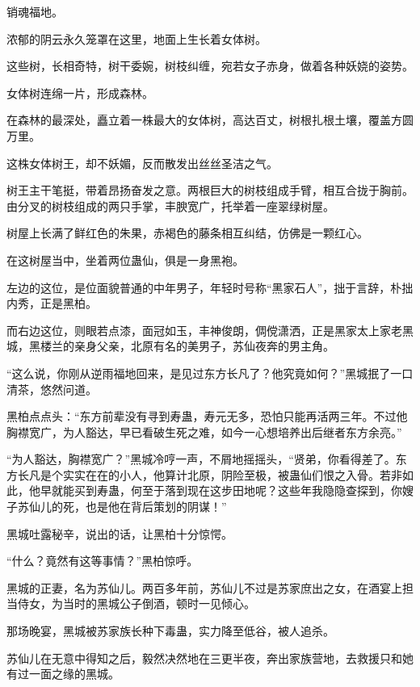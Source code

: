 
\begin{this_body}

销魂福地。

浓郁的阴云永久笼罩在这里，地面上生长着女体树。

这些树，长相奇特，树干委婉，树枝纠缠，宛若女子赤身，做着各种妖娆的姿势。

女体树连绵一片，形成森林。

在森林的最深处，矗立着一株最大的女体树，高达百丈，树根扎根土壤，覆盖方圆万里。

这株女体树王，却不妖媚，反而散发出丝丝圣洁之气。

树王主干笔挺，带着昂扬奋发之意。两根巨大的树枝组成手臂，相互合拢于胸前。由分叉的树枝组成的两只手掌，丰腴宽广，托举着一座翠绿树屋。

树屋上长满了鲜红色的朱果，赤褐色的藤条相互纠结，仿佛是一颗红心。

在这树屋当中，坐着两位蛊仙，俱是一身黑袍。

左边的这位，是位面貌普通的中年男子，年轻时号称“黑家石人”，拙于言辞，朴拙内秀，正是黑柏。

而右边这位，则眼若点漆，面冠如玉，丰神俊朗，倜傥潇洒，正是黑家太上家老黑城，黑楼兰的亲身父亲，北原有名的美男子，苏仙夜奔的男主角。

“这么说，你刚从逆雨福地回来，是见过东方长凡了？他究竟如何？”黑城抿了一口清茶，悠然问道。

黑柏点点头：“东方前辈没有寻到寿蛊，寿元无多，恐怕只能再活两三年。不过他胸襟宽广，为人豁达，早已看破生死之难，如今一心想培养出后继者东方余亮。”

“为人豁达，胸襟宽广？”黑城冷哼一声，不屑地摇摇头，“贤弟，你看得差了。东方长凡是个实实在在的小人，他算计北原，阴险至极，被蛊仙们恨之入骨。若非如此，他早就能买到寿蛊，何至于落到现在这步田地呢？这些年我隐隐查探到，你嫂子苏仙儿的死，也是他在背后策划的阴谋！”

黑城吐露秘辛，说出的话，让黑柏十分惊愕。

“什么？竟然有这等事情？”黑柏惊呼。

黑城的正妻，名为苏仙儿。两百多年前，苏仙儿不过是苏家庶出之女，在酒宴上担当侍女，为当时的黑城公子倒酒，顿时一见倾心。

那场晚宴，黑城被苏家族长种下毒蛊，实力降至低谷，被人追杀。

苏仙儿在无意中得知之后，毅然决然地在三更半夜，奔出家族营地，去救援只和她有过一面之缘的黑城。


\end{this_body}
